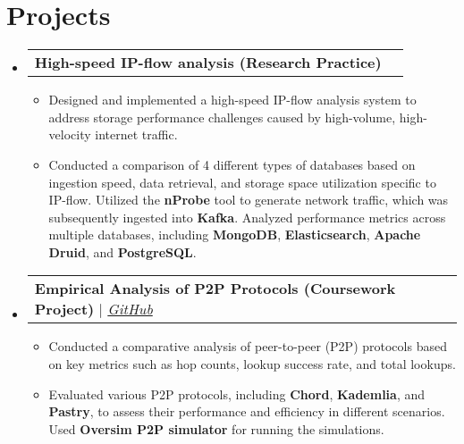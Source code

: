 \documentclass[letterpaper,8pt]{article}
\makeatletter
\newcommand{\resumeItem}[1]{
  \item\small{
    {#1 \vspace{-2pt}}
  }
}
\newcommand{\resumeProjectHeading}[2]{
    \vspace{-2pt}\item
    \begin{tabular*}{0.97\textwidth}{l@{\extracolsep{\fill}}r}
      \small#1 & #2 \\
    \end{tabular*}\vspace{-7pt}
}
\newcommand{\resumeSubHeadingListStart}{\begin{itemize}[leftmargin=0.15in, label={}]}
\newcommand{\resumeSubHeadingListEnd}{\end{itemize}}
\newcommand{\resumeItemListStart}{\begin{itemize}}
\newcommand{\resumeItemListEnd}{\end{itemize}\vspace{-5pt}}
\makeatother
\begin{document}
\section{Projects}
    \vspace{3pt}
    \resumeSubHeadingListStart
      
      \resumeProjectHeading
        {\textbf{High-speed IP-flow analysis (Research Practice)} \emph{}}{}
          \resumeItemListStart
            \resumeItem{Designed and implemented a high-speed IP-flow analysis system to address storage performance challenges caused by high-volume, high-velocity internet traffic.}
            \resumeItem{Conducted a comparison of 4 different types of databases based on ingestion speed, data retrieval, and storage space utilization specific to IP-flow. Utilized the \textbf{nProbe} tool to generate network traffic, which was subsequently ingested into \textbf{Kafka}. Analyzed performance metrics across multiple databases, including \textbf{MongoDB}, \textbf{Elasticsearch}, \textbf{Apache Druid}, and \textbf{PostgreSQL}.}
          \resumeItemListEnd
      
      \resumeProjectHeading
        {\textbf{Empirical Analysis of P2P Protocols (Coursework Project)} $|$ \emph{\href{https://github.com/skjha98/P2P-Protocols-Comparision}{\color{blue}GitHub}}}{}
          \resumeItemListStart
            \resumeItem{Conducted a comparative analysis of peer-to-peer (P2P) protocols based on key metrics such as hop counts, lookup success rate, and total lookups.}
            \resumeItem{Evaluated various P2P protocols, including \textbf{Chord}, \textbf{Kademlia}, and \textbf{Pastry}, to assess their performance and efficiency in different scenarios. Used \textbf{Oversim P2P simulator} for running the simulations.}
          \resumeItemListEnd
      
    \resumeSubHeadingListEnd





\end{document}

